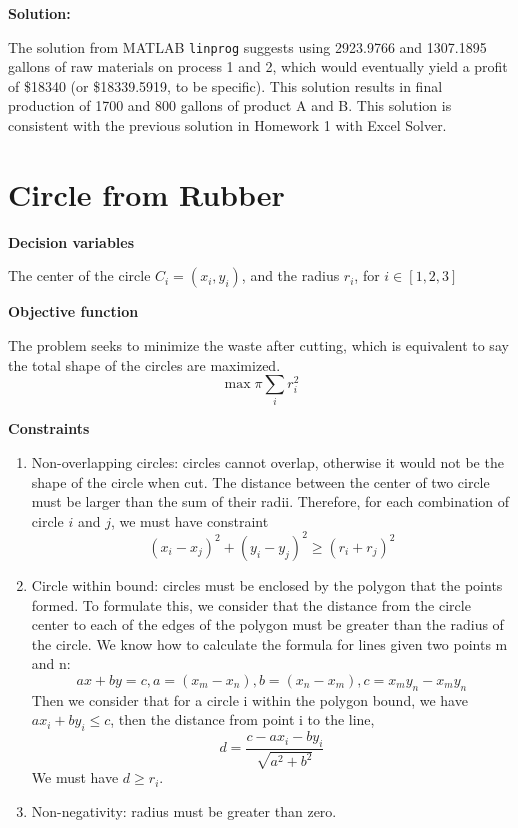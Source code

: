 \textbf{Solution:}\par
The solution from MATLAB \texttt{linprog} suggests using 2923.9766 and 1307.1895 gallons of raw materials on process 1 and 2, which would eventually yield a profit of \$18340 (or \$18339.5919, to be specific). This solution results in final production of 1700 and 800 gallons of product A and B. This solution is consistent with the previous solution in Homework 1 with Excel Solver.

\section{Circle from Rubber}

\textbf{Decision variables}\par
The center of the circle $C_i=(x_i, y_i)$, and the radius $r_i$, for $i \in [1, 2, 3]$

\textbf{Objective function}\par
The problem seeks to minimize the waste after cutting, which is equivalent to say the total shape of the circles are maximized. 
$$
\max \pi\sum_i r_i^2
$$

\textbf{Constraints}
\begin{enumerate}
    \item Non-overlapping circles: circles cannot overlap, otherwise it would not be the shape of the circle when cut. The distance between the center of two circle must be larger than the sum of their radii. Therefore, for each combination of circle $i$ and $j$, we must have constraint
    $$
    (x_i - x_j)^2 + (y_i - y_j)^2 \geq (r_i + r_j)^2
    $$
    
    \item Circle within bound: circles must be enclosed by the polygon that the points formed. To formulate this, we consider that the distance from the circle center to each of the edges of the polygon must be greater than the radius of the circle. We know how to calculate the formula for lines given two points m and n:
    $$
    ax + by = c, a = (x_m - x_n), b = (x_n - x_m), c = x_my_n - x_my_n
    $$
    Then we consider that for a circle i within the polygon bound, we have $ax_i + by_i \leq c$, then the distance from point i to the line,
    $$
    d = \frac{c - ax_i - by_i}{\sqrt{a^2 + b^2}}
    $$
    We must have $d \geq r_i$.
    
    \item Non-negativity: radius must be greater than zero.
\end{enumerate}

